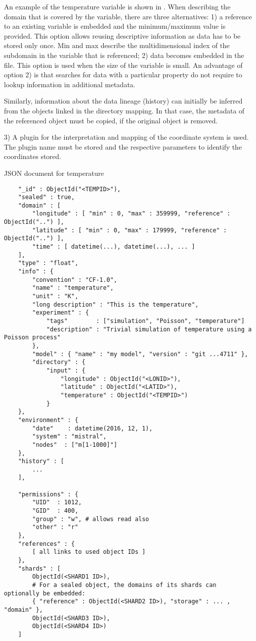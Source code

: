 An example of the temperature variable is shown in .
When describing the domain that is covered by the variable, there are three alternatives:
1) a reference to an existing variable is embedded and the minimum/maximum value is provided. This option allows reusing descriptive information as data has to be stored only once. Min and max describe the multidimensional index of the subdomain in the variable that is referenced;
2) data becomes embedded in the file. This option is used when the size of the variable is small.
An advantage of option 2) is that searches for data with a particular property do not require to lookup information in additional metadata.

Similarly, information about the data lineage (history) can initially be inferred from the objects linked in the directory mapping.
In that case, the metadata of the referenced object must be copied, if the original object is removed.

3) A plugin for the interpretation and mapping of the coordinate system is used.
The plugin name must be stored and the respective parameters to identify the coordinates stored.


\begin{tcbcode}[label={lst:mongotemperature}]{JSON document for temperature}
	\begin{lstlisting}
	"_id" : ObjectId("<TEMPID>"),
	"sealed" : true,
	"domain" : [
		"longitude" : [ "min" : 0, "max" : 359999, "reference" : ObjectId("..") ],
		"latitude" : [ "min" : 0, "max" : 179999, "reference" : ObjectId("..") ],
		"time" : [ datetime(...), datetime(...), ... ]
	],
	"type" : "float",
	"info" : {
		"convention" : "CF-1.0",
		"name" : "temperature",
		"unit" : "K",
		"long description" : "This is the temperature",
		"experiment" : {
			"tags"        : ["simulation", "Poisson", "temperature"]
			"description" : "Trivial simulation of temperature using a Poisson process"
		},
		"model" : { "name" : "my model", "version" : "git ...4711" },
		"directory" : {
			"input" : {
				"longitude" : ObjectId("<LONID>"),
				"latitude" : ObjectId("<LATID>"),
				"temperature" : ObjectId("<TEMPID>")
			}
	},
	"environment" : {
		"date"    : datetime(2016, 12, 1),
		"system" : "mistral",
		"nodes"  : ["m[1-1000]"]
	},
	"history" : [
		...
	],

	"permissions" : {
		"UID"  : 1012,
		"GID"  : 400,
		"group" : "w", # allows read also
		"other" : "r"
	},
	"references" : {
		[ all links to used object IDs ]
	},
	"shards" : [
		ObjectId(<SHARD1 ID>),
		# For a sealed object, the domains of its shards can optionally be embedded:
		{ "reference" : ObjectId(<SHARD2 ID>), "storage" : ... , "domain" },
		ObjectId(<SHARD3 ID>),
		ObjectId(<SHARD4 ID>)
	]
	\end{lstlisting}
\end{tcbcode}


